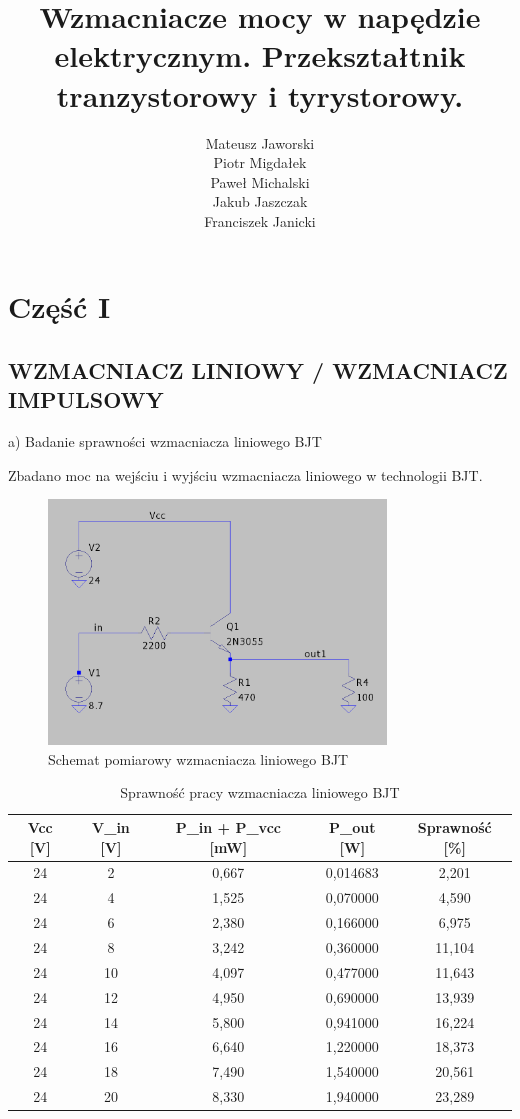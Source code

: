 \documentclass[11pt]{article}
\title{Wzmacniacze mocy w napędzie elektrycznym. Przekształtnik tranzystorowy i tyrystorowy.}
\author{
  Mateusz Jaworski \\
  Piotr Migdałek \\
  Paweł Michalski \\
  Jakub Jaszczak \\
  Franciszek Janicki
}
\begin{document}
\maketitle

\section{Część I}

\subsection{WZMACNIACZ LINIOWY / WZMACNIACZ IMPULSOWY}

a) Badanie sprawności wzmacniacza liniowego BJT

Zbadano moc na wejściu i wyjściu wzmacniacza liniowego w technologii BJT.\\

\begin{figure}[H]
\centering
\includegraphics[width=0.8\textwidth]{aun1_liniowy_bjt.png}
\caption{Schemat pomiarowy wzmacniacza liniowego BJT}
\end{figure}

\begin{table}[H]
\centering
\begin{tabular}{|c|c|c|c|c|}
\hline
\textbf{Vcc [V]} & \textbf{V\_in [V]} & \textbf{P\_in + P\_vcc [mW]} & \textbf{P\_out [W]} & \textbf{Sprawność [\%]} \\
\hline
24 & 2  & 0{,}667  & 0{,}014683 & 2{,}201 \\
\hline
24 & 4  & 1{,}525  & 0{,}070000 & 4{,}590 \\
\hline
24 & 6  & 2{,}380  & 0{,}166000 & 6{,}975 \\
\hline
24 & 8  & 3{,}242  & 0{,}360000 & 11{,}104 \\
\hline
24 & 10 & 4{,}097  & 0{,}477000 & 11{,}643 \\
\hline
24 & 12 & 4{,}950  & 0{,}690000 & 13{,}939 \\
\hline
24 & 14 & 5{,}800  & 0{,}941000 & 16{,}224 \\
\hline
24 & 16 & 6{,}640  & 1{,}220000 & 18{,}373 \\
\hline
24 & 18 & 7{,}490  & 1{,}540000 & 20{,}561 \\
\hline
24 & 20 & 8{,}330  & 1{,}940000 & 23{,}289 \\
\hline
\end{tabular}
\caption{Sprawność pracy wzmacniacza liniowego BJT}
\end{table}
\end{document}
